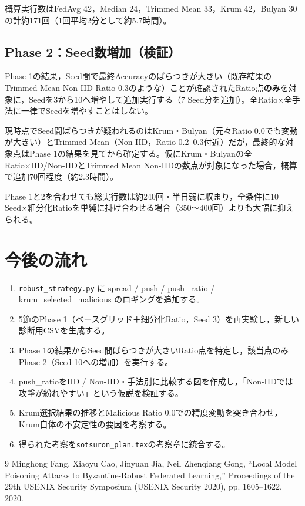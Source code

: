 \documentclass[a4j, twocolumn, dvipdfmx]{jsarticle}
\begin{document}
概算実行数はFedAvg 42，Median 24，Trimmed Mean 33，Krum 42，Bulyan 30の計約171回（1回平均2分として約5.7時間）。

\subsection{Phase 2：Seed数増加（検証）}

Phase 1の結果，Seed間で最終Accuracyのばらつきが大きい（既存結果のTrimmed Mean Non-IID Ratio 0.3のような）ことが確認されたRatio点\textbf{のみ}を対象に，Seedを3から10へ増やして追加実行する（7 Seed分を追加）。全Ratio×全手法に一律でSeedを増やすことはしない。

現時点でSeed間ばらつきが疑われるのはKrum・Bulyan（元々Ratio 0.0でも変動が大きい）とTrimmed Mean（Non-IID，Ratio 0.2--0.3付近）だが，最終的な対象点はPhase 1の結果を見てから確定する。仮にKrum・Bulyanの全Ratio×IID/Non-IIDとTrimmed Mean Non-IIDの数点が対象になった場合，概算で追加70回程度（約2.3時間）。

Phase 1と2を合わせても総実行数は約240回・半日弱に収まり，全条件に10 Seed×細分化Ratioを単純に掛け合わせる場合（350〜400回）よりも大幅に抑えられる。

\section{今後の流れ}

\begin{enumerate}
  \item \texttt{robust\_strategy.py} に spread / push / push\_ratio / krum\_selected\_malicious のロギングを追加する。
  \item 5節のPhase 1（ベースグリッド＋細分化Ratio，Seed 3）を再実験し，新しい診断用CSVを生成する。
  \item Phase 1の結果からSeed間ばらつきが大きいRatio点を特定し，該当点のみPhase 2（Seed 10への増加）を実行する。
  \item push\_ratioをIID / Non-IID・手法別に比較する図を作成し，「Non-IIDでは攻撃が紛れやすい」という仮説を検証する。
  \item Krum選択結果の推移とMalicious Ratio 0.0での精度変動を突き合わせ，Krum自体の不安定性の要因を考察する。
  \item 得られた考察を\texttt{sotsuron\_plan.tex}の考察章に統合する。
\end{enumerate}

\begin{thebibliography}{9}
Minghong Fang,
Xiaoyu Cao,
Jinyuan Jia,
Neil Zhenqiang Gong,
``Local Model Poisoning Attacks to Byzantine-Robust Federated Learning,''
Proceedings of the 29th USENIX Security Symposium (USENIX Security 2020),
pp. 1605--1622,
2020.
\end{thebibliography}
\end{document}
